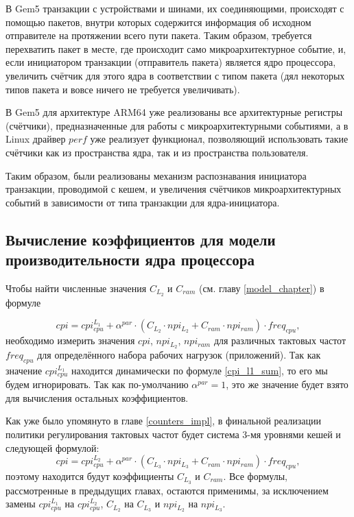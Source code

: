     В Gem5 транзакции с устройствами и шинами, их соединяющими, происходят с помощью пакетов,
    внутри которых содержится информация об исходном отправителе на протяжении всего пути
    пакета. Таким образом, требуется перехватить пакет в месте, где происходит само микроархитектурное
    событие, и, если инициатором транзакции (отправитель пакета) является ядро процессора,
    увеличить счётчик для этого ядра в соответствии с типом пакета (дял некоторых типов пакета и вовсе
    ничего не требуется увеличивать).

    В Gem5 для архитектуре ARM64 уже реализованы все архитектурные регистры (счётчики), предназначенные
    для работы с микроархитектурными событиями, а в Linux драйвер $perf$ уже реализует функционал,
    позволяющий использовать такие счётчики как из пространства ядра, так и из пространства пользователя.

    Таким образом, были реализованы механизм распознавания инициатора транзакции, проводимой
    с кешем, и увеличения счётчиков микроархитектурных событий в зависимости от типа транзакции
    для ядра-инициатора.

\subsection{Вычисление коэффициентов для модели производительности ядра процессора} \label{model_coeffs}

    Чтобы найти численные значения $C_{L_2}$ и $C_{ram}$ (см. главу \ref{model_chapter}) в формуле

    \begin{equation*}
        cpi = cpi_{cpu}^{L_1} + \alpha^{par} \cdot
        \left( C_{L_2} \cdot npi_{L_2} + C_{ram} \cdot npi_{ram} \right) \cdot freq_{cpu},
    \end{equation*}
    необходимо измерить значения $cpi$, $npi_{L_2}$, $npi_{ram}$ для различных тактовых частот
    $freq_{cpu}$ для определённого набора рабочих нагрузок (приложений). Так как значение $cpi_{cpu}^{L_1}$
    находится динамически по формуле \eqref{cpi_l1_sum}, то его мы будем игнорировать. Так как
    по-умолчанию $\alpha^{par} = 1$, это же значение будет взято для вычисления остальных коэффициентов.

    Как уже было упомянуто в главе \ref{counters_impl}, в финальной реализации политики регулирования тактовых
    частот будет система 3-мя уровнями кешей и следующей формулой:
    \begin{equation} \label{cpi_formula_3lvl}
        cpi = cpi_{cpu}^{L_2} + \alpha^{par} \cdot
        \left( C_{L_3} \cdot npi_{L_3} + C_{ram} \cdot npi_{ram} \right) \cdot freq_{cpu},
    \end{equation}
    поэтому находится будут коэффициенты $C_{L_3}$ и $C_{ram}$. Все формулы, рассмотренные в предыдущих
    главах, остаются применимы, за исключением замены $cpi_{cpu}^{L_1}$ на $cpi_{cpu}^{L_2}$,
    $C_{L_2}$ на $C_{L_3}$ и $npi_{L_2}$ на $npi_{L_3}$.

